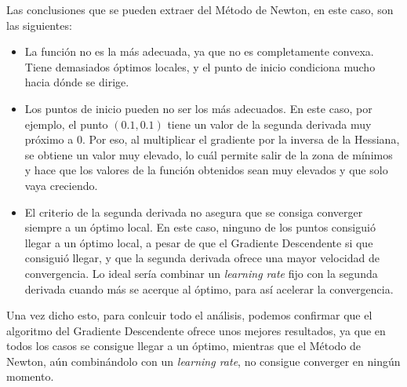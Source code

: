 \documentclass[11pt,a4paper]{article}
\begin{document}
Las conclusiones que se pueden extraer del Método de Newton, en este caso, son las siguientes:
 
\begin{itemize}[label=\textbullet]
	\item La función no es la más adecuada, ya que no es completamente convexa. Tiene demasiados óptimos locales, y el punto
	de inicio condiciona mucho hacia dónde se dirige.
	\item Los puntos de inicio pueden no ser los más adecuados. En este caso, por ejemplo, el punto $(0.1, 0.1)$ tiene un valor
	de la segunda derivada muy próximo a 0. Por eso, al multiplicar el gradiente por la inversa de la Hessiana, se obtiene un
	valor muy elevado, lo cuál permite salir de la zona de mínimos y hace que los valores de la función obtenidos sean muy
	elevados y que solo vaya creciendo.
	\item El criterio de la segunda derivada no asegura que se consiga converger siempre a un óptimo local. En este caso,
	ninguno de los puntos consiguió llegar a un óptimo local, a pesar de que el Gradiente Descendente si que consiguió llegar,
	y que la segunda derivada ofrece una mayor velocidad de convergencia. Lo ideal sería combinar un \textit{learning rate}
	fijo con la segunda derivada cuando más se acerque al óptimo, para así acelerar la convergencia.
\end{itemize}

Una vez dicho esto, para conlcuir todo el análisis, podemos confirmar que el algoritmo del Gradiente Descendente ofrece
unos mejores resultados, ya que en todos los casos se consigue llegar a un óptimo, mientras que el Método de Newton, aún
combinándolo con un \textit{learning rate}, no consigue converger en ningún momento.
\end{document}
